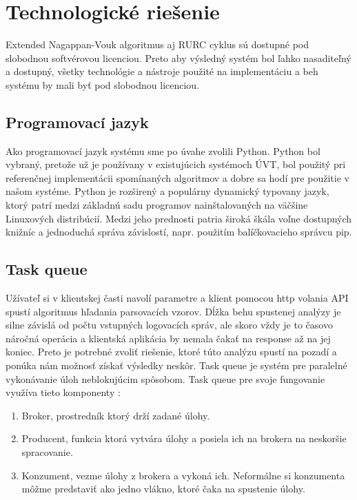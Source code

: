 \section{Technologické riešenie}

Extended Nagappan-Vouk algoritmus aj RURC cyklus sú dostupné pod slobodnou softvérovou licenciou. Preto aby výsledný systém bol ľahko nasaditeľný a dostupný, všetky technológie a nástroje použité na implementáciu a beh systému by mali byť pod slobodnou licenciou.

\subsection{Programovací jazyk}
Ako programovací jazyk systému sme po úvahe zvolili Python. Python bol vybraný, pretože už je používany v existujúcich systémoch ÚVT, bol použitý pri referenčnej implementácii spomínaných algoritmov a dobre sa hodí pre použitie v našom systéme. Python je rozširený a populárny dynamický typovany jazyk, ktorý patrí medzi základnú sadu programov nainštalovaných na väčšine Linuxových distribúcií. Medzi jeho prednosti patria široká škála voľne dostupných knižníc a jednoduchá správa závislostí, napr. použitím balíčkovacieho správcu pip. 

\subsection{Task queue}
Užívateľ si v klientskej časti navolí parametre a klient pomocou http volania API spustí algoritmus hľadania parsovacích vzorov.
Dĺžka behu spustenej analýzy je silne závislá od počtu vstupných logovacích správ, ale skoro vždy je to časovo náročná operácia a klientská aplikácia by nemala čakať na response až na jej koniec. Preto je potrebné zvoliť riešenie, ktoré túto analýzu spustí na pozadí a ponúka nám možnosť získať výsledky neskôr. Task queue je systém pre paralelné vykonávanie úloh neblokujúcim spôsobom. Task queue pre svoje fungovanie využíva tieto komponenty :

\begin{enumerate}
  \item Broker, prostredník ktorý drží zadané úlohy.
  \item Producent, funkcia ktorá vytvára úlohy a posiela ich na brokera na neskoršie spracovanie.
  \item Konzument, vezme úlohy z brokera a vykoná ich. Neformálne si konzumenta môžme predstaviť ako jedno vlákno, ktoré čaka na spustenie úlohy.
\end{enumerate}

